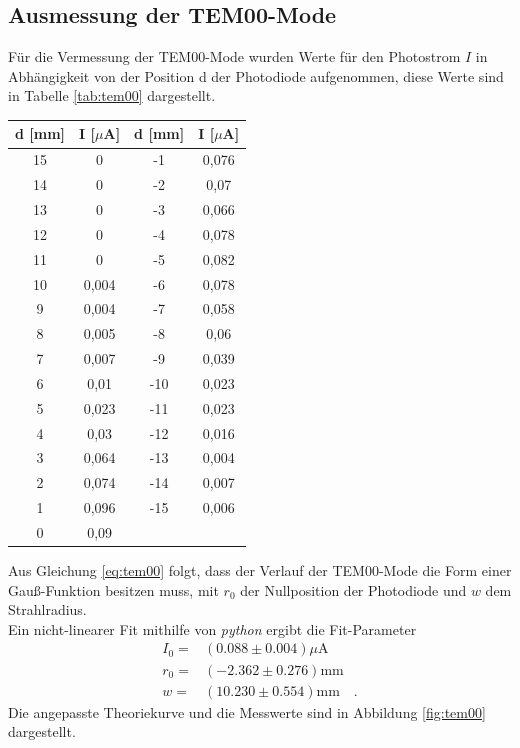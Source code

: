 \documentclass[]{scrartcl}
\begin{document}
\subsection{Ausmessung der TEM00-Mode}
Für die Vermessung der TEM00-Mode wurden Werte für den Photostrom $I$ in Abhängigkeit von der Position d der Photodiode aufgenommen, diese Werte sind in Tabelle \ref{tab:tem00} dargestellt.
\begin{center}
	\begin{tabular}{|c|c||c|c|}
		\hline d [mm] & I [$\mu$A] & d [mm] & I [$\mu$A]\\
		\hline	15	&	0	&	-1	&	0,076	\\
				14	&	0	&	-2	&	0,07	\\
				13	&	0	&	-3	&	0,066	\\
				12	&	0	&	-4	&	0,078	\\
				11	&	0	&	-5	&	0,082	\\
				10	&	0,004	&	-6	&	0,078	\\
				9	&	0,004	&	-7	&	0,058	\\
				8	&	0,005	&	-8	&	0,06	\\
				7	&	0,007	&	-9	&	0,039	\\
				6	&	0,01	&	-10	&	0,023	\\
				5	&	0,023	&	-11	&	0,023	\\
				4	&	0,03	&	-12	&	0,016	\\
				3	&	0,064	&	-13	&	0,004	\\
				2	&	0,074	&	-14	&	0,007	\\
				1	&	0,096	&	-15	&	0,006	\\
				0	&	0,09	&		&		\\
		\hline
	\end{tabular}
	\label{tab:tem00}
\end{center}
Aus Gleichung \ref{eq:tem00} folgt, dass der Verlauf der TEM00-Mode die Form einer Gauß-Funktion besitzen muss, mit $r_0$ der Nullposition der Photodiode und $w$ dem Strahlradius. \\
Ein nicht-linearer Fit mithilfe von \textit{python} ergibt die Fit-Parameter
\begin{align*}
I_0=& (0.088 \pm 0.004) \si{\mu\ampere}\\
r_0=& (-2.362 \pm 0.276) \si{\milli\metre}\\
w=&  (10.230  \pm 0.554) \si{\milli\metre}\quad.
\end{align*}
Die angepasste Theoriekurve und die Messwerte sind in Abbildung \ref{fig:tem00} dargestellt.
\end{document}
